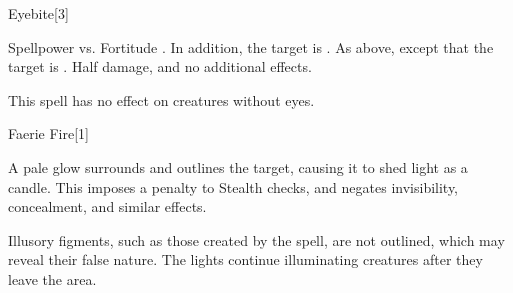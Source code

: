 \begin{spellsection}{Eyebite}[3]
    \begin{spellcontent}
        \begin{spelltargetinginfo}
        \end{spelltargetinginfo}
        \begin{spelleffects}
            \begin{spellattack}{Spellpower vs. Fortitude}
                \spellsuccess {}. In addition, the target is \partiallyblinded.
                \spellcritical As above, except that the target is \blinded.
                \spellfailure Half damage, and no additional effects.
            \end{spellattack}
        \end{spelleffects}
    \end{spellcontent}
    \begin{spellfooter}
        \spellnotes This spell has no effect on creatures without eyes.
        \miscastrandom
    \end{spellfooter}
\end{spellsection}


\begin{spellsection}{Faerie Fire}[1]
    \begin{spellheader}
    \end{spellheader}
    \begin{spellcontent}
        \begin{spelltargetinginfo}
        \end{spelltargetinginfo}
        \begin{spelleffects}
            \spelleffect A pale glow surrounds and outlines the target, causing it to shed light as a candle. This imposes a  penalty to Stealth checks, and negates invisibility, concealment, and similar effects.
            \spelldur \durbrief
        \end{spelleffects}
    \end{spellcontent}
    \begin{spellfooter}
        \spellnotes Illusory figments, such as those created by the  spell, are not outlined, which may reveal their false nature. The lights continue illuminating creatures after they leave the area.
        \miscastyou
    \end{spellfooter}
\end{spellsection}

